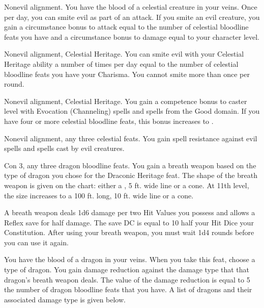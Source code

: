  Nonevil alignment.
 You have the blood of a celestial creature in your veins. Once per day, you can smite evil as part of an attack. If you smite an evil creature, you gain a circumstance bonus to attack equal to the number of celestial bloodline feats you have and a circumstance bonus to damage equal to your character level.

 Nonevil alignment, Celestial Heritage.
 You can smite evil with your Celestial Heritage ability a number of times per day equal to the number of celestial bloodline feats you have \add your Charisma. You cannot smite more than once per round.

 Nonevil alignment, Celestial Heritage.
 You gain a  competence bonus to caster level with Evocation (Channeling) spells and spells from the Good domain. If you have four or more celestial bloodline feats, this bonus increases to .

 Nonevil alignment, any three celestial feats.
 You gain spell resistance against evil spells and spells cast by evil creatures.

 Con 3, any three dragon bloodline feats.
 You gain a breath weapon based on the type of dragon you chose for the Draconic Heritage feat. The shape of the breath weapon is given on the  chart: either a \arealarge, 5 ft. wide line or a \areamed cone. At 11th level, the size increases to a 100 ft. long, 10 ft. wide line or a \arealarge cone.

A breath weapon deals 1d6 damage per two Hit Values you possess and allows a Reflex save for half damage. The save DC is equal to 10 \add half your Hit Dice \add your Constitution. After using your breath weapon, you must wait 1d4 rounds before you can use it again.

 You have the blood of a dragon in your veins. When you take this feat, choose a type of dragon. You gain damage reduction against the damage type that that dragon's breath weapon deals. The value of the damage reduction is equal to 5 \mtimes the number of dragon bloodline feats that you have. A list of dragons and their associated damage type is given below.

